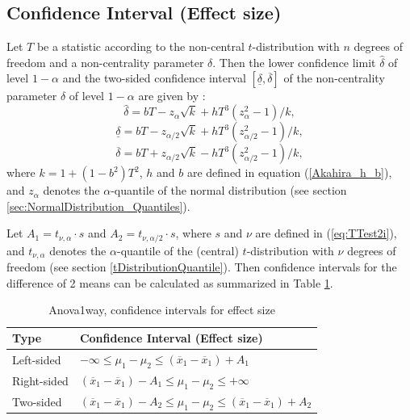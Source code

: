 \newpage
\subsection{Confidence Interval (Effect size)}


\vspace{0.3cm}
Let $T$ be a statistic according to the non-central $t$-distribution
with $n$ degrees of freedom and a non-centrality parameter $\delta$. Then
the lower confidence limit $\widehat{\delta}$ of level $1-\alpha$ and the two-sided confidence interval $[ \underline{\delta},\overline{\delta}]$ of the
non-centrality parameter $\delta$ of level $1-\alpha$ are given by \cite{akahira_1995}:
\begin{equation}
	\widehat{\delta} = bT - z_\alpha \sqrt{k} +  h T^3 (z_\alpha^2 - 1)/k,
\end{equation} 
\begin{equation}
	\underline{\delta} = bT - z_{\alpha/2} \sqrt{k} +  h T^3 (z_{\alpha/2}^2 - 1)/k,
\end{equation} 
\begin{equation}
	\overline{\delta} = bT + z_{\alpha/2} \sqrt{k} -  h T^3 (z_{\alpha/2}^2 - 1)/k,
\end{equation} 
where $k=1+(1-b^2)T^2$, $h$ and $b$ are defined in equation (\ref{Akahira_h_b}), and $z_\alpha$ denotes the $\alpha$-quantile of the normal distribution (see section \ref{sec:NormalDistribution_Quantiles}).


Let $A_1=t_{\nu,\alpha} \cdot s$ and $A_2=t_{\nu,\alpha/2} \cdot s$, where $s$ and $\nu$ are defined in (\ref{eq:TTest2i}), and $t_{\nu,\alpha}$ denotes the $\alpha$-quantile of the (central) $t$-distribution with $\nu$ degrees of freedom (see section \ref{tDistributionQuantile}). Then confidence intervals for the difference of 2 means can be calculated as summarized in Table \ref{Anova1way, EffectSize}.

\begin{table}[ht]
	\centering
	\begin{tabular}{|l|l|}
		\hline
		Type & Confidence Interval (Effect size)\\
		\hline
		Left-sided &  $-\infty \leq \mu_1 - \mu_2 \leq (\overline{x}_1-\overline{x}_1) + A_1$ \\
		Right-sided &  $(\overline{x}_1-\overline{x}_1) - A_1 \leq \mu_1 - \mu_2 \leq +\infty$\\
		Two-sided & $(\overline{x}_1-\overline{x}_1) - A_2 \leq \mu_1 - \mu_2 \leq (\overline{x}_1-\overline{x}_1) + A_2$ \\
		\hline
	\end{tabular}
	\caption{Anova1way, confidence intervals for effect size}
	\label{Anova1way, EffectSize}
\end{table}






